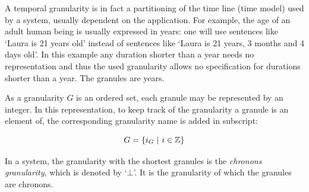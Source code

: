 A temporal granularity is in fact a partitioning of the time line (time model) used by a system, usually dependent on the application. For example, the age of an adult human being is usually expressed in years: one will use sentences like `Laura is 21 years old' instead of sentences like `Laura is 21 years, 3 months and 4 days old'. In this example any duration shorter than a year needs no representation and thus the used granularity allows no specification for durations shorter than a year. The granules are years.

As a granularity $G$ is an ordered set, each granule may be represented by an integer. In this representation, to keep track of the granularity a granule is an element of, the corresponding granularity name is added in subscript:

\begin{equation}
G = \left\{i_{G}\ |\ i \in \mathbb{Z} \right\}
\end{equation}





In a system, the granularity with the shortest granules is the \emph{chronons granularity}, which is denoted by `$\bot$'. It is the granularity of which the granules are chronons. 


